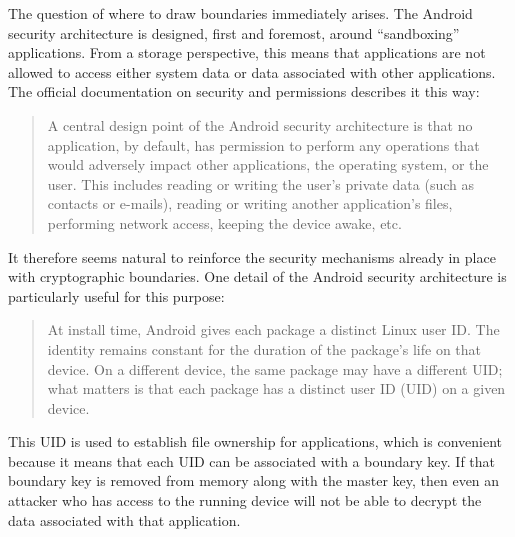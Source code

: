 The question of where to draw boundaries immediately arises. The Android security architecture is designed, first and foremost,
around ``sandboxing'' applications. From a storage perspective, this means that applications are not allowed to access either
system data or data associated with other applications. The official documentation on security and permissions describes it this way: 
\begin{quote} 
A central design point of the Android security architecture is that no application, by default, has permission to perform any
operations that would adversely impact other applications, the operating system, or the user.  This includes reading or writing the
user's private data (such as contacts or e-mails), reading or writing another application's files, performing network access,
keeping the device awake, etc. \cite{securitydoc} 
\end{quote} 
It therefore seems natural to reinforce the security
mechanisms already in place with cryptographic boundaries.  One detail of the Android security architecture is particularly useful
for this purpose: 
\begin{quote} 
At install time, Android gives each package a distinct Linux user ID. The identity remains constant
for the duration of the package's life on that device. On a different device, the same package may have a different UID; what
matters is that each package has a distinct user ID (UID) on a given device. \cite{securitydoc}
\end{quote} 
This UID is used to establish file ownership for applications, which is convenient because it means that each UID can be associated
with a boundary key.  If that boundary key is removed from memory along with the master key, then even an attacker who has access to
the running device will not be able to decrypt the data associated with that application.

